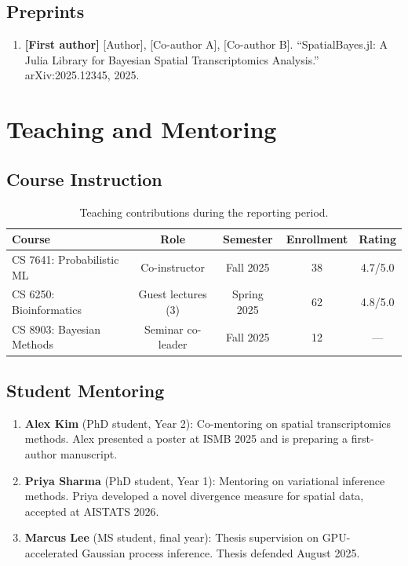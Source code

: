 \documentclass[
    language=english,
    doctype=postdoc-report,
    institution=none,
]{../../omnilatex}
\begin{document}
\subsection{Preprints}

\begin{enumerate}
    \item \textbf{[First author]} [Author], [Co-author A], [Co-author B].
          ``SpatialBayes.jl: A Julia Library for Bayesian Spatial
          Transcriptomics Analysis.'' arXiv:2025.12345, 2025.
\end{enumerate}

\section{Teaching and Mentoring}
\label{sec:teaching}

\subsection{Course Instruction}

\begin{table}[htbp]
    \centering
    \caption{Teaching contributions during the reporting period.}
    \label{tab:teaching}
    \begin{tabular}{@{}lcccc@{}}
        \toprule
        Course & Role & Semester & Enrollment & Rating \\
        \midrule
        CS 7641: Probabilistic ML & Co-instructor & Fall 2025 & 38 & 4.7/5.0 \\
        CS 6250: Bioinformatics & Guest lectures (3) & Spring 2025 & 62 & 4.8/5.0 \\
        CS 8903: Bayesian Methods & Seminar co-leader & Fall 2025 & 12 & --- \\
        \bottomrule
    \end{tabular}
\end{table}

\subsection{Student Mentoring}

\begin{enumerate}
    \item \textbf{Alex Kim} (PhD student, Year 2): Co-mentoring on spatial
          transcriptomics methods. Alex presented a poster at ISMB 2025
          and is preparing a first-author manuscript.

    \item \textbf{Priya Sharma} (PhD student, Year 1): Mentoring on
          variational inference methods. Priya developed a novel divergence
          measure for spatial data, accepted at AISTATS 2026.

    \item \textbf{Marcus Lee} (MS student, final year): Thesis supervision
          on GPU-accelerated Gaussian process inference. Thesis defended
          August 2025.
\end{enumerate}
\end{document}
